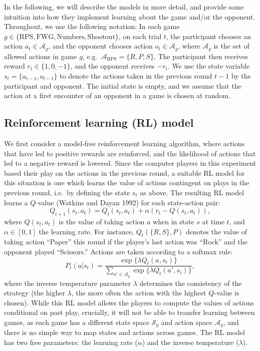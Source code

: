 \documentclass[smallextended]{svjour3}       %
\begin{document}
In the following, we will describe the models in more detail, and
provide some intuition into how they implement learning about the game
and/or the opponent. Throughout, we use the following notation: In each
game
\(g \in \{\text{RPS},\text{FWG}, \text{Numbers}, \text{Shootout} \}\),
on each trial \(t\), the participant chooses an action
\(a_t \in \mathcal{A}_g\), and the opponent chooses action
\(o_t \in \mathcal{A}_g\), where \(\mathcal{A}_g\) is the set of allowed
actions in game \(g\), e.g.~\(\mathcal{A}_\text{RPS} = \{R,P,S\}\). The
participant then receives reward \(r_t \in \{1,0,-1\}\), and the
opponent receives \(-r_t\). We use the state variable
\(s_t = \{a_{t-1},o_{t-1}\}\) to denote the actions taken in the
previous round \(t-1\) by the participant and opponent. The initial
state is empty, and we assume that the action at a first encounter of an
opponent in a game is chosen at random.

\hypertarget{reinforcement-learning-rl-model}{%
\subsection{Reinforcement learning (RL)
model}\label{reinforcement-learning-rl-model}}

We first consider a model-free reinforcement learning algorithm, where
actions that have led to positive rewards are reinforced, and the
likelihood of actions that led to a negative reward is lowered. Since
the computer players in this experiment based their play on the actions
in the previous round, a suitable RL model for this situation is one
which learns the value of actions contingent on plays in the previous
round, i.e.~by defining the state \(s_{t}\) as above. The resulting RL
model learns a \(Q\)-value (Watkins and Dayan 1992) for each
state-action pair:
\[Q_{t+1}(s_{t},a_{t}) = Q_{t}(s_{t},a_{t}) + \alpha \left( r_{t}  - Q(s_{t},a_{t}) \right) ,\]
where \(Q(s_{t},a_{t})\) is the value of taking action \(a\) when in
state \(s\) at time \(t\), and \(\alpha \in [0,1]\) the learning rate.
For instance, \(Q_t(\{R,S\},P)\) denotes the value of taking action
``Paper'' this round if the player's last action was ``Rock'' and the
opponent played ``Scissors.'' Actions are taken according to a softmax
rule:
\[P_{t}(a|s_t) = \frac{\exp \{ \lambda Q_{t}(a,s_t) \}}{\sum_{a' \in \mathcal{A}_g} \exp \{\lambda  Q_{t}(a',s_t) \}}, \]
where the inverse temperature parameter \(\lambda\) determines the
consistency of the strategy (the higher \(\lambda\), the more often the
action with the highest \(Q\)-value is chosen). While this RL model
allows the players to compute the values of actions conditional on past
play, crucially, it will not be able to transfer learning between games,
as each game has a different state space \(\mathcal{S}_g\) and action
space \(\mathcal{A}_g\), and there is no simple way to map states and
actions across games. The RL model has two free parameters: the learning
rate (\(\alpha\)) and the inverse temperature (\(\lambda\)).
\end{document}
